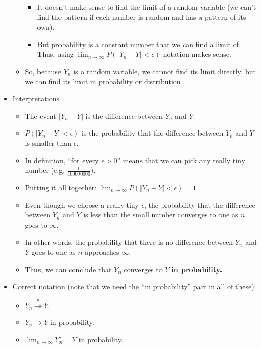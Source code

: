 \documentclass{article}
\newcommand{\convp}[2]{#1 \overset{p} \to #2}		%
\begin{document}
\begin{itemize}
\begin{itemize}
\begin{itemize}
            \item[] It doesn't make sense to find the limit of a random variable (we can't find the pattern if each number is random and has a pattern of its own).
            \item But probability is a constant number that we can find a limit of. Thus, using $\displaystyle \lim_{n \to \infty} P(\lvert Y_n - Y \rvert < \epsilon)$ notation makes sense.
        \end{itemize}
        \item So, because $Y_n$ is a random variable, we cannot find its limit directly, but we can find its limit in probability or distribution.
    \end{itemize}\bigskip
    \item Interpretations
    \begin{itemize}
        \item The event $\lvert Y_n - Y \rvert$ is the difference between $Y_n$ and $Y$.
        \item $P(\lvert Y_n - Y \rvert < \epsilon)$ is the probability that the difference between $Y_n$ and $Y$ is smaller than $\epsilon$.
        \item[] In definition, ``for every $\epsilon > 0$'' means that we can pick any really tiny number (e.g. $\frac{1}{100000000}$).
        \item Putting it all together: $\displaystyle \lim_{n \to \infty} P(\lvert Y_n - Y \rvert < \epsilon) = 1$
        \item[] Even though we choose a really tiny $\epsilon$, the probability that the difference between $Y_n$ and $Y$ is less than the small number converges to one as $n$ goes to $\infty$.
        \item In other words, the probability that there is no difference between $Y_n$ and $Y$ goes to one as $n$ approaches $\infty$.\vspace{40pt}
        \item[] Thus, we can conclude that $Y_n$ converges to $Y$ \textbf{in probability.}
    \end{itemize}
    \item Correct notation (note that we need the ``in probability'' part in all of these):
    \begin{itemize}
        \item $\convp{Y_n}{Y}$.
        \item $Y_n \to Y$ in probability.
        \item $\lim_{n \to \infty} Y_n = Y$ in probability.
    \end{itemize}
\end{itemize}\bigskip
\end{document}
